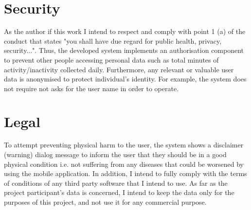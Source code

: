     \section{Security}
    As the author if this work I intend to respect and comply with point 1 (a) of the conduct that states "you shall have due regard for public health, privacy, security...". Thus, the developed system implements an authorisation component to prevent other people accessing personal data such as total minutes of activity/inactivity collected daily. Furthermore, any relevant or valuable user data is anonymised to protect individual’s identity. For example, the system does not require not asks for the user name in order to operate.

    
    \section{Legal}
    To attempt preventing physical harm to the user, the system shows a disclaimer (warning) dialog message to inform the user that they should be in a good physical condition i.e. not suffering from any diseases that could be worsened by using the mobile application. In addition, I intend to fully comply with the terms of conditions of any third party software that I intend to use. As far as the project participant’s data is concerned, I intend to keep the data only for the purposes of this project, and not use it for any commercial purpose.